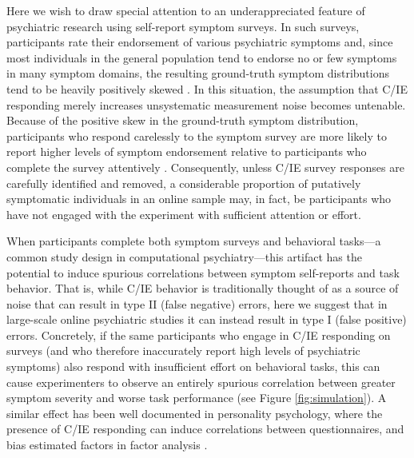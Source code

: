 \documentclass[a4paper,notitlepage,12pt]{article}
\begin{document}
\begin{refsection}[main]
Here we wish to draw special attention to an underappreciated feature of psychiatric research using self-report symptom surveys. In such surveys, participants rate their endorsement of various psychiatric symptoms and, since most individuals in the general population tend to endorse no or few symptoms in many symptom domains, the resulting ground-truth symptom distributions tend to be heavily positively skewed \cite{lowe2008validation, tomitaka2018distributional}. In this situation, the assumption that C/IE responding merely increases unsystematic measurement noise becomes untenable. Because of the positive skew in the ground-truth symptom distribution, participants who respond carelessly to the symptom survey are more likely to report higher levels of symptom endorsement relative to participants who complete the survey attentively \cite{chandler2020participant, ophir2020turker, king2018random}. Consequently, unless C/IE survey responses are carefully identified and removed, a considerable proportion of putatively symptomatic individuals in an online sample may, in fact, be participants who have not engaged with the experiment with sufficient attention or effort.

When participants complete both symptom surveys and behavioral tasks---a common study design in computational psychiatry---this artifact has the potential to induce spurious correlations between symptom self-reports and task behavior. That is, while C/IE behavior is traditionally thought of as a source of noise that can result in type II (false negative) errors, here we suggest that in large-scale online psychiatric studies it can instead result in type I (false positive) errors. Concretely, if the same participants who engage in C/IE responding on surveys (and who therefore inaccurately report high levels of psychiatric symptoms) also respond with insufficient effort on behavioral tasks, this can cause experimenters to observe an entirely spurious correlation between greater symptom severity and worse task performance (see Figure \ref{fig:simulation}). A similar effect has been well documented in personality psychology, where the presence of C/IE responding can induce correlations between questionnaires, and bias estimated factors in factor analysis \cite{huang2012detecting, robinson2014inaccurate, huang2015insufficient, chandler2020participant, arias2020little}.


\end{refsection}
\end{document}
